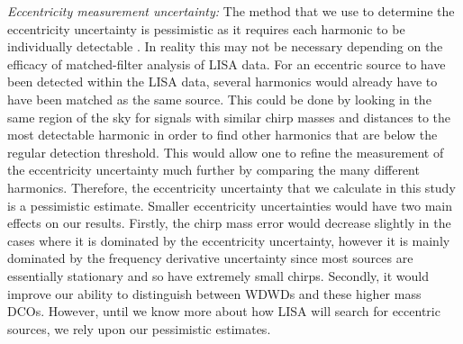 \textit{Eccentricity measurement uncertainty:} The method that we use to determine the eccentricity uncertainty is pessimistic as it requires each harmonic to be individually detectable \citep[e.g.][]{Lau+2020}. In reality this may not be necessary depending on the efficacy of matched-filter analysis of LISA data. For an eccentric source to have been detected within the LISA data, several harmonics would already have to have been matched as the same source. This could be done by looking in the same region of the sky for signals with similar chirp masses and distances to the most detectable harmonic in order to find other harmonics that are below the regular detection threshold. This would allow one to refine the measurement of the eccentricity uncertainty much further by comparing the many different harmonics. Therefore, the eccentricity uncertainty that we calculate in this study is a pessimistic estimate. Smaller eccentricity uncertainties would have two main effects on our results. Firstly, the chirp mass error would decrease slightly in the cases where it is dominated by the eccentricity uncertainty, however it is mainly dominated by the frequency derivative uncertainty since most sources are essentially stationary and so have extremely small chirps. Secondly, it would improve our ability to distinguish between WDWDs and these higher mass DCOs. However, until we know more about how LISA will search for eccentric sources, we rely upon our pessimistic estimates.